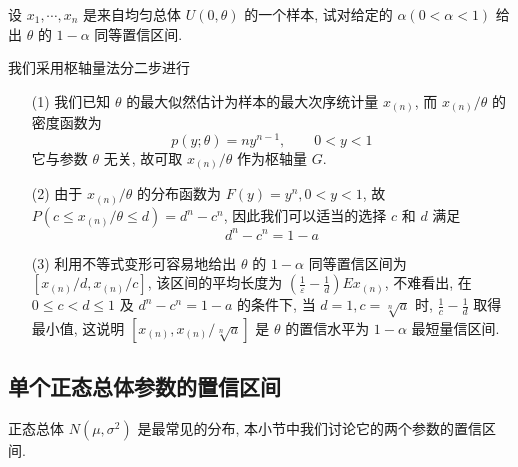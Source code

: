 \begin{example}
设 $x_{1}, \cdots, x_{n}$ 是来自均匀总体 $U(0, \theta)$ 的一个样本, 试对给定的 $\alpha(0<\alpha<1)$ 给出 $\theta$ 的 $1-\alpha$ 同等置信区间.
\end{example}\begin{solution}
我们采用枢轴量法分二步进行
\begin{enumerate}
\item[(1)] 我们已知 $\theta$ 的最大似然估计为样本的最大次序统计量 $x_{(n)}$, 而 $x_{(n)} / \theta$ 的密度函数为
\[p(y ; \theta)=n y^{n-1}, \qquad 0<y<1\]
它与参数 $\theta$ 无关, 故可取 $x_{(n)} / \theta$ 作为枢轴量 $G$.
\item[(2)] 由于 $x_{(n)} / \theta$ 的分布函数为 $F(y)=y^{n}, 0<y<1$, 故 $P\left(c \leqslant x_{(n)} / \theta \leqslant d\right)=d^{n}-c^{n}$, 因此我们可以适当的选择 $c$ 和 $d$ 满足
\[d^{n}-c^{n}=1-a\]
\item[(3)] 利用不等式变形可容易地给出 $\theta$ 的 $1-\alpha$ 同等置信区间为 $\left[x_{(n)} / d,x_{(n)}/c\right]$, 该区间的平均长度为 $\left(\frac{1}{\varepsilon}-\frac{1}{d}\right) E x_{(n)}$, 不难看出, 在 $0 \leqslant c<d \leqslant 1$ 及 $d^{n}-c^{n}=1-a$ 的条件下, 当 $d=1, c=\sqrt[n]{a}$ 时, $\frac{1}{c}-\frac{1}{d}$ 取得最小值, 这说明 $\left[x_{(n)},x_{(n)} / \sqrt[n]{a} \right]$ 是 $\theta$ 的置信水平为 $1-\alpha$ 最短量信区间.
\end{enumerate}
\end{solution}

\subsection{单个正态总体参数的置信区间}\label{ssec:6.5.3}

正态总体 $N(\mu,\sigma^2)$ 是最常见的分布, 本小节中我们讨论它的两个参数的置信区间.

